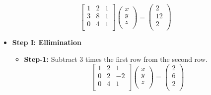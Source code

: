 \documentclass[a4paper,11pt]{article}
\numberwithin{equation}{section}
\begin{document}
\begin{itemize}
        \begin{equation}
            \begin{bmatrix}
                1 & 2 & 1 \\
                3 & 8 & 1 \\
                0 & 4 & 1 \\
            \end{bmatrix}
            \begin{pmatrix}
                x \\
                y \\
                z \\
            \end{pmatrix}=
            \begin{pmatrix}
                2 \\
                12 \\
                2 \\
            \end{pmatrix}
        \end{equation}
        \begin{itemize}
            \item \textbf{Step I: Ellimination}\\
            \begin{itemize}
                \item \textbf{Step-1:} Subtract 3 times the first row from the second row.
                \begin{equation}
                    \begin{bmatrix}
                        1 & 2 & 1 \\
                        0 & 2 & -2 \\
                        0 & 4 & 1 \\
                    \end{bmatrix}
                    \begin{pmatrix}
                        x \\
                        y \\
                        z \\
                    \end{pmatrix}=
                    \begin{pmatrix}
                        2 \\
                        6 \\
                        2 \\
                    \end{pmatrix}

\end{equation}
\end{itemize}
\end{itemize}
\end{itemize}
\end{document}
